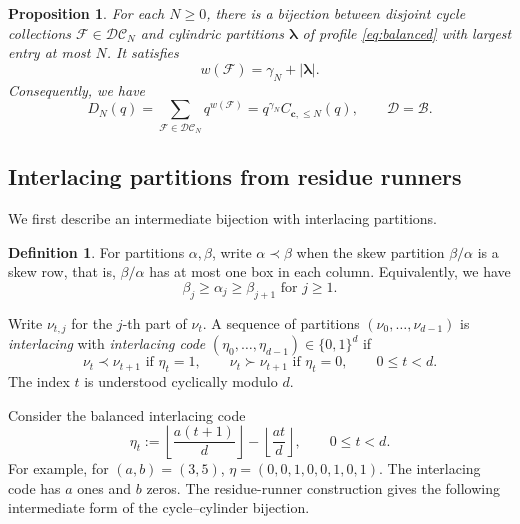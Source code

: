 \documentclass[12pt,reqno]{amsart}
\numberwithin{equation}{section}
\newtheorem{proposition}[theorem]{Proposition}
\theoremstyle{definition}
\newtheorem{definition}[theorem]{Definition}
\theoremstyle{remark}
\theoremstyle{plain}
\newcommand{\cc}{\mathbf c}
\newcommand{\Dseries}{\mathscr D}
\newcommand{\Bseries}{\mathscr B}
\begin{document}
\begin{proposition}
\label{prop:cyclecylinder}
For each $N\ge0$, there is a bijection between disjoint cycle collections $\mathcal F\in \mathcal{DC}_N$ and cylindric partitions
$\boldsymbol\lambda$ of profile \eqref{eq:balanced} with largest entry
at most $N$.  It satisfies
\[
 w(\mathcal F)=\gamma_N+|\boldsymbol\lambda|.
\]
Consequently, we have
\begin{equation}\label{eq:cyclecylindertarget}
 D_N(q)=\sum_{\mathcal F\in \mathcal{DC}_N}q^{w(\mathcal F)}
        =q^{\gamma_N}C_{\cc,\le N}(q),
 \qquad \Dseries=\Bseries.
\end{equation}
\end{proposition}
\subsection{Interlacing partitions from residue runners}\label{subsec:runnermap}
We first describe an intermediate bijection with interlacing partitions.
\begin{definition}
    For partitions $\alpha,\beta$, write $\alpha\prec \beta$ when the skew partition $\beta/\alpha$ is a skew row, that is, $\beta/\alpha$ has at most one box in each column. Equivalently, we have
    \begin{equation}\label{eq:interlacing-inequality}
        \beta_j\ge \alpha_j\ge \beta_{j+1}\text{ for }j\ge 1.
    \end{equation}

    Write $\nu_{t,j}$ for the $j$-th part of $\nu_t$. A sequence of partitions $(\nu_0,\dots,\nu_{d-1})$ is \emph{interlacing} with \emph{interlacing code} $(\eta_0,\dots,\eta_{d-1})\in \{0,1\}^d$ if 
    \begin{equation}\label{eq:interlacing}\nu_t\prec \nu_{t+1} \text{ if }\eta_t=1, \qquad \nu_t\succ \nu_{t+1} \text{ if }\eta_t=0, \qquad 0\leq t<d.\end{equation}
    The index $t$ is understood cyclically modulo $d$.
\end{definition}

Consider the balanced interlacing code
\begin{equation}
    \label{eq:balancedinterlacing}
    \eta_t:=\left\lfloor\frac{a(t+1)}d\right\rfloor-
          \left\lfloor\frac{at}d\right\rfloor,\qquad 0\le t<d.
\end{equation}
For example, for $(a,b)=(3,5)$, $\eta=(0,0,1,0,0,1,0,1)$. The interlacing code has $a$ ones and $b$ zeros.
The residue-runner construction gives the following intermediate form of the cycle--cylinder bijection.
\end{document}
